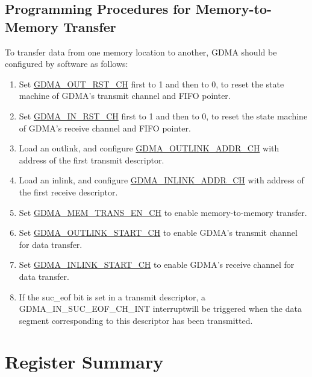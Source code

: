 \documentclass[main\_\_EN.tex]{subfiles}
\begin{document}
\subsection{Programming Procedures for Memory-to-Memory Transfer}
To transfer data from one memory location to another, GDMA should be configured by software as follows:
\begin{enumerate}
    \item Set \hyperref[fielddesc:GDMAOUTRSTCHN]{GDMA\_OUT\_RST\_CH} first to 1 and then to 0, to reset the state machine of GDMA's transmit channel and FIFO pointer.
    \item Set \hyperref[fielddesc:GDMAINRSTCHN]{GDMA\_IN\_RST\_CH} first to 1 and then to 0, to reset the state machine of GDMA's receive channel and FIFO pointer.
    \item Load an outlink, and configure \hyperref[fielddesc:GDMAOUTLINKADDRCHN]{GDMA\_OUTLINK\_ADDR\_CH} with address of the first transmit descriptor.
    \item Load an inlink, and configure \hyperref[fielddesc:GDMAINLINKADDRCHN]{GDMA\_INLINK\_ADDR\_CH} with address of the first receive descriptor.
    \item Set \hyperref[fielddesc:GDMAMEMTRANSENCHN]{GDMA\_MEM\_TRANS\_EN\_CH} to enable memory-to-memory transfer.
    \item Set \hyperref[fielddesc:GDMAOUTLINKSTARTCHN]{GDMA\_OUTLINK\_START\_CH} to enable GDMA's transmit channel for data transfer.
    \item Set \hyperref[fielddesc:GDMAINLINKSTARTCHN]{GDMA\_INLINK\_START\_CH} to enable GDMA's receive channel for data transfer.
    \item If the suc\_eof bit is set in a transmit descriptor, a GDMA\_IN\_SUC\_EOF\_CH\_INT interruptwill be triggered when the data segment corresponding to this descriptor has been transmitted.
\end{enumerate}




\clearpage
\section{Register Summary}
\label{sec:dma-reg-summ}
\hypertarget{dma-reg-summ}{}
\end{document}
